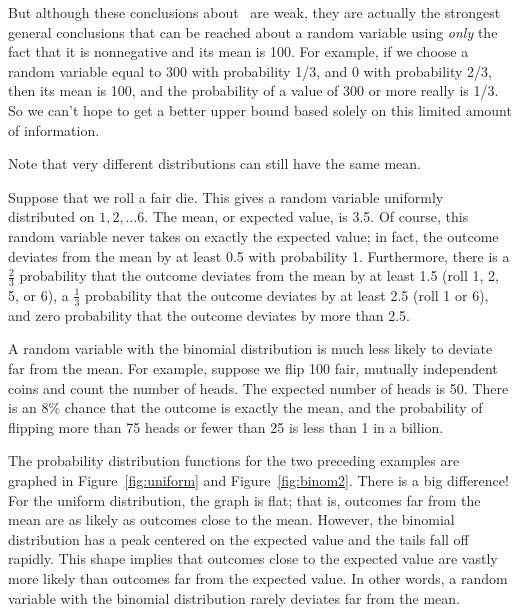 But although these conclusions about \IQ\ are weak, they are actually the
strongest general conclusions that can be reached about a random
variable using \emph{only} the fact that it is nonnegative and its mean is
100.  For example, if we choose a random variable equal to 300 with
probability 1/3, and 0 with probability 2/3, then its mean is 100, and the
probability of a value of 300 or more really is 1/3.  So we can't hope to
get a better upper bound based solely on this limited amount of
information.

\begin{editingnotes}

Note that very different distributions can still have the same mean.

\begin{example}
  Suppose that we roll a fair die.  This gives a random variable
  uniformly distributed on $1, 2, \dots 6$.  The mean, or expected
  value, is 3.5.  Of course, this random variable never takes on
  exactly the expected value; in fact, the outcome deviates from the
  mean by at least 0.5 with probability 1.  Furthermore, there is a
  $\frac{2}{3}$ probability that the outcome deviates from the mean by
  at least 1.5 (roll 1, 2, 5, or 6), a $\frac{1}{3}$ probability that
  the outcome deviates by at least 2.5 (roll 1 or 6), and zero
  probability that the outcome deviates by more than 2.5.
\end{example}

\begin{example}
  A random variable with the binomial distribution is much less likely
  to deviate far from the mean.  For example, suppose we flip 100
  fair, mutually independent coins and count the number of heads.  The
  expected number of heads is 50.  There is an 8\% chance that the
  outcome is exactly the mean, and the probability of flipping more
  than 75 heads or fewer than 25 is less than 1 in a billion.
\end{example}

The probability distribution functions for the two preceding examples
are graphed in Figure~\ref{fig:uniform} and Figure~\ref{fig:binom2}.
There is a big difference!  For the uniform distribution, the graph is
flat; that is, outcomes far from the mean are as likely as outcomes
close to the mean.  However, the binomial distribution has a peak
centered on the expected value and the tails fall off rapidly.  This
shape implies that outcomes close to the expected value are vastly
more likely than outcomes far from the expected value.  In other
words, a random variable with the binomial distribution rarely
deviates far from the mean.


\end{editingnotes}
